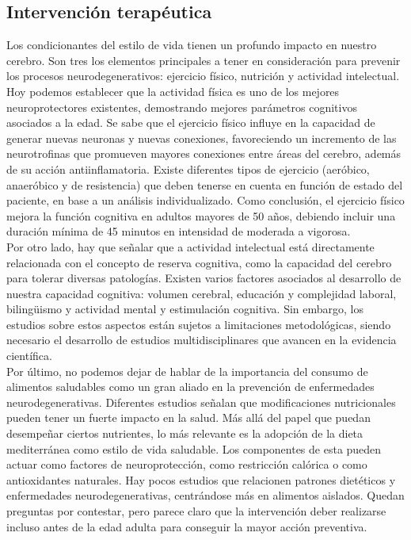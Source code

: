 \subsection{Intervención terapéutica}

Los condicionantes del estilo de vida tienen un profundo impacto en nuestro cerebro. Son tres los elementos principales a tener en consideración para prevenir los procesos neurodegenerativos: ejercicio físico, nutrición y actividad intelectual.\\

Hoy podemos establecer que la actividad física es uno de los mejores neuroprotectores existentes, demostrando mejores parámetros cognitivos asociados a la edad. Se sabe que el ejercicio físico influye en la capacidad de generar nuevas neuronas y nuevas conexiones, favoreciendo un incremento de las neurotrofinas que promueven mayores conexiones entre áreas del cerebro, además de su acción antiinflamatoria. Existe diferentes tipos de ejercicio (aeróbico, anaeróbico y de resistencia) que deben tenerse en cuenta en función de estado del paciente, en base a un análisis individualizado. Como conclusión, el ejercicio físico mejora la función cognitiva en adultos mayores de 50 años, debiendo incluir una duración mínima de 45 minutos en intensidad de moderada a vigorosa.\\

Por otro lado, hay que señalar que a actividad intelectual está directamente relacionada con el concepto de reserva cognitiva, como la capacidad del cerebro para tolerar diversas patologías. Existen varios factores asociados al desarrollo de nuestra capacidad cognitiva: volumen cerebral, educación y complejidad laboral, bilingüismo y actividad mental y estimulación cognitiva. Sin embargo, los estudios sobre estos aspectos están sujetos a limitaciones metodológicas, siendo necesario el desarrollo de estudios multidisciplinares que avancen en la evidencia científica.\\

Por último, no podemos dejar de hablar de la importancia del consumo de alimentos saludables como un gran aliado en la prevención de enfermedades neurodegenerativas. Diferentes estudios señalan que modificaciones nutricionales pueden tener un fuerte impacto en la salud. Más allá del papel que puedan desempeñar ciertos nutrientes, lo más relevante es la adopción de la dieta mediterránea como estilo de vida saludable. Los componentes de esta pueden actuar como factores de neuroprotección, como restricción calórica o como antioxidantes naturales. Hay pocos estudios que relacionen patrones dietéticos y enfermedades neurodegenerativas, centrándose más en alimentos aislados. Quedan preguntas por contestar, pero parece claro que la intervención deber realizarse incluso antes de la edad adulta para conseguir la mayor acción preventiva.\\




